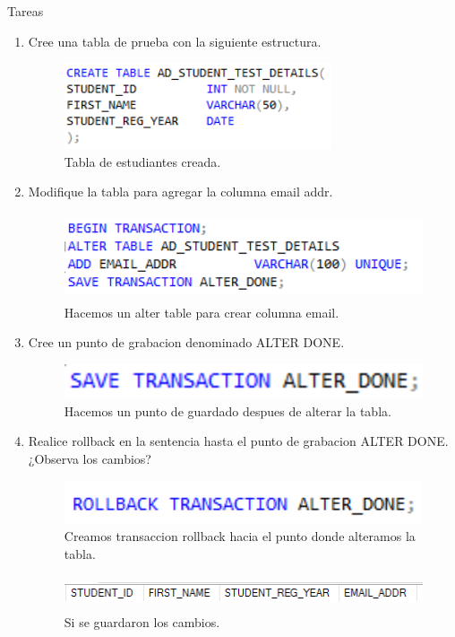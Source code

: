 \documentclass[12pt,letterpaper]{article}
\begin{document}
Tareas\\
\begin{enumerate}[1.]
\item Cree una tabla de prueba con la siguiente estructura.
\begin{figure}[H]
	\centering
	\caption{Tabla de estudiantes creada.}
	\includegraphics[height=1in]{./LeoImagen/PruebasBD_1.png} 
\end{figure}
\item Modifique la tabla para agregar la columna email addr.
\begin{figure}[H]
	\centering
	\caption{Hacemos un alter table para crear columna email.}
	\includegraphics[height=1in]{./LeoImagen/PruebasBD_2.png} 
\end{figure}
\item Cree un punto de grabacion denominado ALTER DONE.
\begin{figure}[H]
	\centering
	\caption{Hacemos un punto de guardado despues de alterar la tabla.}
	\includegraphics[height=0.4in]{./LeoImagen/PruebasBD_3.png} 
\end{figure}
\item Realice rollback en la sentencia hasta el punto de grabacion ALTER DONE. ¿Observa los cambios?
\begin{figure}[H]
	\centering
	\caption{Creamos transaccion rollback hacia el punto donde alteramos la tabla.}
	\includegraphics[height=0.5in]{./LeoImagen/PruebasBD_4.png} 
\end{figure}
\begin{figure}[H]
	\centering
	\caption{Si se guardaron los cambios.}
	\includegraphics[height=0.4in]{./LeoImagen/PruebasBD_4_1.png} 

\end{figure}
\end{enumerate}
\end{document}
